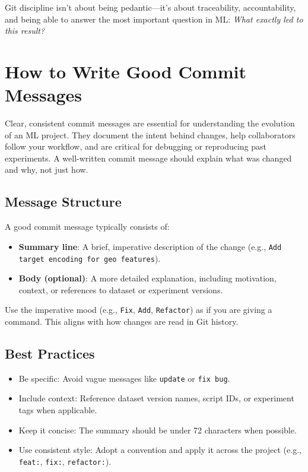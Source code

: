 \documentclass[12pt,openany]{book}
\begin{document}
Git discipline isn't about being pedantic—it’s about traceability, accountability, and being able to answer the most important question in ML: \textit{What exactly led to this result?}



\section{How to Write Good Commit Messages}

Clear, consistent commit messages are essential for understanding the evolution of an ML project. They document the intent behind changes, help collaborators follow your workflow, and are critical for debugging or reproducing past experiments. A well-written commit message should explain what was changed and why, not just how.

\subsection*{Message Structure}

A good commit message typically consists of:

\begin{itemize}
    \item \textbf{Summary line}: A brief, imperative description of the change (e.g., \texttt{Add target encoding for geo features}).
    \item \textbf{Body (optional)}: A more detailed explanation, including motivation, context, or references to dataset or experiment versions.
\end{itemize}

Use the imperative mood (e.g., \texttt{Fix}, \texttt{Add}, \texttt{Refactor}) as if you are giving a command. This aligns with how changes are read in Git history.

\subsection*{Best Practices}

\begin{itemize}
    \item Be specific: Avoid vague messages like \texttt{update} or \texttt{fix bug}.
    \item Include context: Reference dataset version names, script IDs, or experiment tags when applicable.
    \item Keep it concise: The summary should be under 72 characters when possible.
    \item Use consistent style: Adopt a convention and apply it across the project (e.g., \texttt{feat:}, \texttt{fix:}, \texttt{refactor:}).
\end{itemize}
\end{document}
